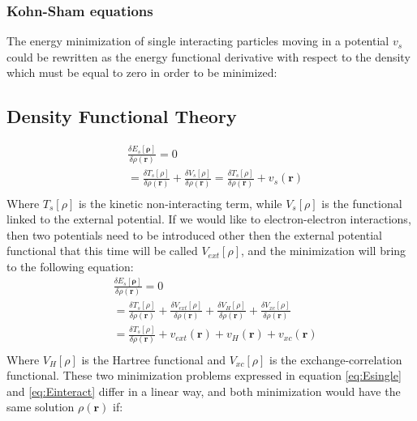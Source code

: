 \subsubsection{Kohn-Sham equations}

The energy minimization of single interacting particles moving in a potential $v_s$ could be rewritten as the energy functional derivative with respect to the density which must be equal to zero in order to be minimized:
\subsection{Density Functional Theory}
\begin{equation}
\begin{split}
\label{eq:Esingle}
&\frac{\delta E_s[\mathbf{\rho}]}{\delta \rho(\mathbf{r})} = 0 \\
&= \frac{\delta T_s[\rho]}{\delta \rho(\mathbf{r})}
+\frac{\delta V_s[\rho]}{\delta \rho(\mathbf{r})}
= \frac{\delta T_s[\rho]}{\delta \rho(\mathbf{r})}
+v_s(\mathbf{r})\\
\end{split}
\end{equation}
Where $T_s[\rho]$ is the kinetic non-interacting term, while $V_s[\rho]$ is the functional linked to the external potential. If we would like to electron-electron interactions, then two potentials need to be introduced other then the external potential functional that this time will be called $V_{ext}[\rho]$, and the minimization will bring to the following equation:
\begin{equation}
\begin{split}
\label{eq:Einteract}
&\frac{\delta E_s[\mathbf{\rho}]}{\delta \rho(\mathbf{r})} = 0 \\
&= \frac{\delta T_s[\rho]}{\delta \rho(\mathbf{r})}
+\frac{\delta V_{ext}[\rho]}{\delta \rho(\mathbf{r})}
+\frac{\delta V_{H}[\rho]}{\delta \rho(\mathbf{r})}
+\frac{\delta V_{xc}[\rho]}{\delta \rho(\mathbf{r})}\\
&= \frac{\delta T_s[\rho]}{\delta \rho(\mathbf{r})}
+v_{ext}(\mathbf{r})
+v_{H}(\mathbf{r})
+v_{xc}(\mathbf{r})\\
\end{split}
\end{equation}
Where $V_{H}[\rho]$ is the Hartree functional and $V_{xc}[\rho]$ is the exchange-correlation functional. These two minimization problems expressed in equation \ref{eq:Esingle} and \ref{eq:Einteract} differ in a linear way, and both minimization would have the same solution $\rho(\mathbf{r})$ if:
